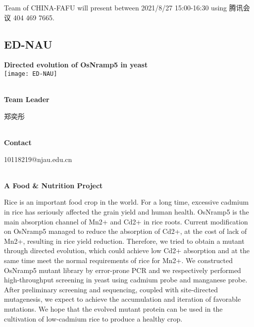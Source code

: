 \vfill{}









Team of CHINA-FAFU will present between  2021/8/27 15:00-16:30       using 腾讯会议 404 469 7665.
\newpage


\subsection{\textcolor{Blu}{ ED-NAU } }
\vspace{5mm}
\begin{center}
\large{
  \textbf{ Directed evolution of OsNramp5 in yeast }\\

  \texttt{[image: ED-NAU]}
}
\end{center}
\textbf{\\Team Leader}

  郑奕彤


\textbf{\\Contact}

  10118219@njau.edu.cn


\textbf{\\A Food & Nutrition Project\\}\begin{spacing}{1.5}

Rice is an important food crop in the world.  For a long time, excessive cadmium in rice has seriously affected the grain yield and human health.  OsNramp5 is the main absorption channel of Mn2+ and Cd2+ in rice roots.  Current modification on OsNramp5 managed to reduce the absorption of Cd2+, at the cost of lack of Mn2+, resulting in rice yield reduction.  Therefore, we tried to obtain a mutant through directed evolution, which could achieve low Cd2+ absorption and at the same time meet the normal requirements of rice for Mn2+.  We constructed OsNramp5 mutant library by error-prone PCR and we respectively performed high-throughput screening in yeast using cadmium probe and manganese probe.  After preliminary screening and sequencing, coupled with site-directed mutagenesis, we expect to achieve the accumulation and iteration of favorable mutations.  We hope that the evolved mutant protein can be used in the cultivation of low-cadmium rice to produce a healthy crop.\end{spacing}
\\

\vfill{}









